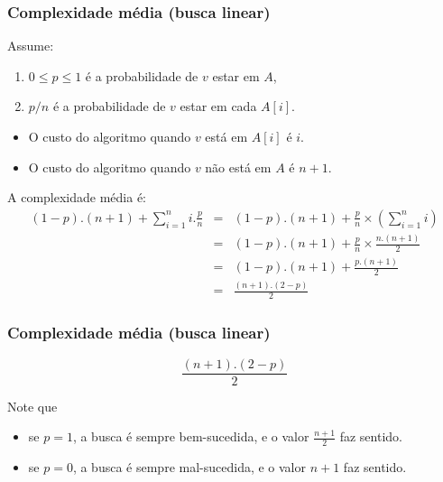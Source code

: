 \documentclass[handout]{beamer}
\begin{document}
\begin{frame}
\frametitle{Complexidade média (busca linear)}

Assume:
\begin{enumerate}
\item $0 \le p \le 1$ é a probabilidade de $v$ estar em $A$, 
\item $p/n$ é a probabilidade de $v$ estar em cada $A[i]$.
\end{enumerate}

\begin{itemize}
\item O custo do algoritmo quando $v$ está em $A[i]$ é $i$.
\item O custo do algoritmo quando $v$ não está em $A$ é $n+1$.
\end{itemize}

A complexidade média é:
\begin{eqnarray*}
(1-p).(n+1) + \sum_{i=1}^{n} i.\frac{p}{n}
& = & (1-p).(n+1) + \frac{p}{n}\times(\sum_{i=1}^{n} i) \\
& = & (1-p).(n+1) + \frac{p}{n}\times\frac{n.(n+1)}{2} \\
& = & (1-p).(n+1) + \frac{p.(n+1)}{2} \\
& = & \frac{(n+1).(2 - p)}{2}
\end{eqnarray*}

\end{frame}

\begin{frame}
\frametitle{Complexidade média (busca linear)}

$$\frac{(n+1).(2 - p)}{2}$$

Note que
\begin{itemize}
\item se $p=1$, a busca é sempre bem-sucedida, e o valor $\frac{n+1}{2}$ faz sentido.
\item se $p=0$, a busca é sempre mal-sucedida, e o valor $n+1$ faz sentido.
\end{itemize}

\end{frame}
\end{document}

